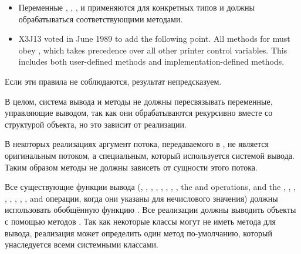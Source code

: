 \begin{defun}
\begin{itemize}
\item 
Переменные , , , 
 и  применяются для конкретных типов и
должны обрабатываться соответствующими методами.

\item X3J13 voted in June 1989  to add the following point.
   All methods for  must obey ,
   which takes precedence over all other printer control variables.  This
   includes both user-defined methods and implementation-defined methods.
\end{itemize}

Если эти правила не соблюдаются, результат непредсказуем.

В целом, система вывода и методы  не должны пересвязывать
переменные, управляющие выводом, так как они обрабатываются рекурсивно вместе со
структурой объекта, но это зависит от реализации.

В некоторых реализациях аргумент потока, передаваемого в , не
является оригинальным потоком, а специальным, который используется системой
вывода. Таким образом методы не должны зависеть от сущности этого потока.

Все существующие функции вывода (, , 
, , , , 
, , the  and 
  operations, and the , ,
, , , \cd{{\Xtilde}\$}, 
, , and   операции,
когда они указаны для нечислового значения) должны использовать обобщённую
функцию . Все реализации должны выводить объекты с помощью
методов . Так как некоторые классы могут не иметь метода для
вывода, реализация может определить один метод по-умолчанию, который
унаследуется всеми системными классами.
\end{defun}

